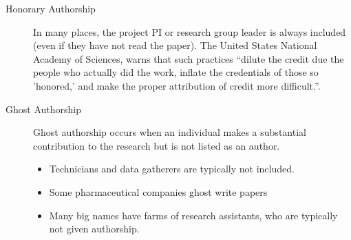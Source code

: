 \documentclass[a4paper,landscape,headrule,footrule,xetex]{foils}
\begin{document}
\begin{description}
\item [Honorary Authorship] In many places, the project PI or research
   group leader is always included (even if they have not read the
  paper).  The United States National Academy of Sciences, warns that
  such practices ``dilute the credit due the people who actually did
  the work, inflate the credentials of those so 'honored,' and make
  the proper attribution of credit more difficult.''.



\item [Ghost Authorship] Ghost authorship occurs when an individual
  makes a substantial contribution to the research but is not listed
  as an author.
  \begin{itemize}
  \item Technicians and data gatherers are typically not included.
  \item Some pharmaceutical companies ghost write papers
  \item Many big names have farms of research assistants, who are
    typically not given authorship.
  \end{itemize}
\end{description}  

\end{document}
